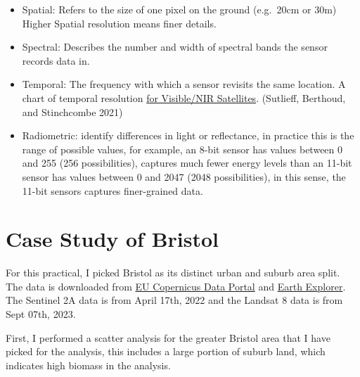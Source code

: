 \documentclass[
  letterpaper,
  DIV=11,
  numbers=noendperiod]{scrreprt}
\providecommand{\tightlist}{%
  \setlength{\itemsep}{0pt}\setlength{\parskip}{0pt}}\usepackage{longtable,booktabs,array}
\begin{document}
\begin{itemize}
  \begin{itemize}
  \tightlist
  \item
    Spatial: Refers to the size of one pixel on the ground (e.g.~20cm or
    30m) Higher Spatial resolution means finer details.
  \item
    Spectral: Describes the number and width of spectral bands the
    sensor records data in.
  \item
    Temporal: The frequency with which a sensor revisits the same
    location. A chart of temporal resolution
    \href{https://link.springer.com/article/10.1007/s10712-021-09637-5/figures/4}{for
    Visible/NIR Satellites}. (Sutlieff, Berthoud, and Stinchcombe 2021)
  \item
    Radiometric: identify differences in light or reflectance, in
    practice this is the range of possible values, for example, an 8-bit
    sensor has values between 0 and 255 (256 possibilities), captures
    much fewer energy levels than an 11-bit sensor has values between 0
    and 2047 (2048 possibilities), in this sense, the 11-bit sensors
    captures finer-grained data.
  \end{itemize}
\end{itemize}

\hypertarget{case-study-of-bristol}{%
\section*{Case Study of Bristol}\label{case-study-of-bristol}}


For this practical, I picked Bristol as its distinct urban and suburb
area split. The data is downloaded from
\href{https://dataspace.copernicus.eu/}{EU Copernicus Data Portal} and
\href{https://earthexplorer.usgs.gov}{Earth Explorer}. The Sentinel 2A
data is from April 17th, 2022 and the Landsat 8 data is from Sept 07th,
2023.

First, I performed a scatter analysis for the greater Bristol area that
I have picked for the analysis, this includes a large portion of suburb
land, which indicates high biomass in the analysis.
\end{document}
